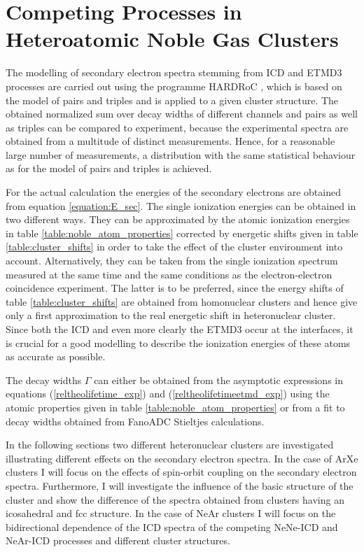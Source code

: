 \chapter[Heteroatomic Noble Gas Clusters]{Competing Processes in Heteroatomic Noble Gas Clusters}
\label{chapter_clusters}

The modelling of secondary electron spectra stemming from \ac{ICD}
and \ac{ETMD}3 processes are carried out using the programme
HARDRoC \cite{HARDRoC}, which is based on the model of pairs and
triples and is applied to a given cluster structure. The obtained
normalized sum over decay widths of different channels
and pairs as well as triples can be compared to experiment, because the
experimental spectra are obtained from a multitude of distinct measurements.
Hence, for a reasonable large number of measurements, a distribution with the
same statistical behaviour as for the model of pairs and triples is achieved.

For the actual calculation the energies of the secondary electrons are obtained
from equation \ref{equation:E_sec}. The single ionization energies
can be obtained in two different ways. They can be
approximated by the atomic ionization energies in table
\ref{table:noble_atom_properties} corrected by energetic shifts
given in table \ref{table:cluster_shifts} in order to take
the effect of the cluster environment into account. 
Alternatively, they can be taken from the single ionization spectrum
measured at the same time and the same conditions as the electron-electron
coincidence experiment. The latter is to be preferred, since the energy shifts
of table \ref{table:cluster_shifts} are obtained from homonuclear clusters and
hence give only a first approximation to the real energetic shift in
heteronuclear cluster. Since both the \ac{ICD} and even more clearly the
\ac{ETMD}3 occur at the interfaces, it is crucial for a good modelling to
describe the ionization energies of these atoms as accurate as possible.

The decay widths $\Gamma$ can either be obtained from the asymptotic expressions
in equations (\ref{reltheolifetime_exp}) and (\ref{reltheolifetimeetmd_exp})
using the atomic properties given in table \ref{table:noble_atom_properties}
or from a fit to decay widths obtained from FanoADC Stieltjes calculations.

In the following sections two different heteronuclear clusters are investigated
illustrating different effects on the secondary electron spectra.
In the case of ArXe clusters I will focus on the effects of spin-orbit coupling
on the secondary electron spectra. Furthermore, I will investigate the influence
of the basic structure of the cluster and show the difference of the spectra
obtained from clusters having an icosahedral
and \ac{fcc} structure.
In the case of NeAr clusters I will focus on the bidirectional dependence of
the ICD spectra of the competing NeNe-ICD and NeAr-ICD processes and
different cluster structures. 

\newpage

\newpage


